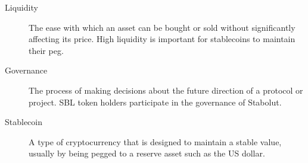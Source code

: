 \documentclass[11pt, a4paper]{article} %
\begin{document}
\begin{description}
\item[Liquidity] The ease with which an asset can be bought or sold without significantly affecting its price. High liquidity is important for stablecoins to maintain their peg.

\item[Governance] The process of making decisions about the future direction of a protocol or project. SBL token holders participate in the governance of Stabolut.

\item [Stablecoin] A type of cryptocurrency that is designed to maintain a stable value, usually by being pegged to a reserve asset such as the US dollar.
\end{description}

 
\end{document}
